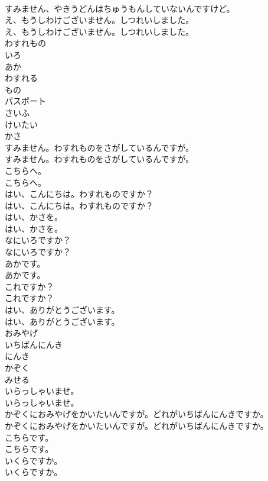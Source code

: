 \documentclass[8pt]{extreport}
\begin{document}
\begin{CJK}{UTF8}{min}
\\	すみません、やきうどんはちゅうもんしていないんですけど。 
\\	え、もうしわけございません。しつれいしました。	
\\	え、もうしわけございません。しつれいしました。 
\\	わすれもの
\\	いろ
\\	あか
\\	わすれる
\\	もの
\\	パスポート
\\	さいふ
\\	けいたい
\\	かさ
\\	すみません。わすれものをさがしているんですが。	
\\	すみません。わすれものをさがしているんですが。 
\\	こちらへ。	
\\	こちらへ。 
\\	はい、こんにちは。わすれものですか？	
\\	はい、こんにちは。わすれものですか？ 
\\	はい、かさを。	
\\	はい、かさを。 
\\	なにいろですか？	
\\	なにいろですか？ 
\\	あかです。	
\\	あかです。 
\\	これですか？	
\\	これですか？ 
\\	はい、ありがとうございます。	
\\	はい、ありがとうございます。 
\\	おみやげ
\\	いちばんにんき
\\	にんき
\\	かぞく
\\	みせる
\\	いらっしゃいませ。	
\\	いらっしゃいませ。 
\\	かぞくにおみやげをかいたいんですが。どれがいちばんにんきですか。	
\\	かぞくにおみやげをかいたいんですが。どれがいちばんにんきですか。 
\\	こちらです。	
\\	こちらです。 
\\	いくらですか。	
\\	いくらですか。 

\end{CJK}
\end{document}
